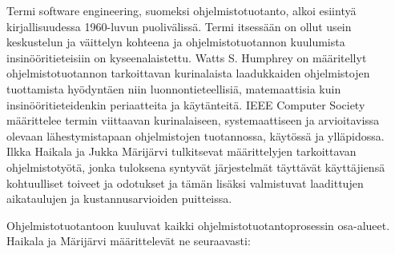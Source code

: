 \documentclass[finnish,12pt]{tktltiki2}
\theoremstyle{definition}
\theoremstyle{remark}
\begin{document}
Termi software engineering, suomeksi ohjelmistotuotanto, alkoi esiintyä kirjallisuudessa 1960-luvun puolivälissä. Termi itsessään on ollut usein keskustelun ja väittelyn kohteena ja ohjelmistotuotannon kuulumista insinööritieteisiin on kyseenalaistettu. \cite{DBLP:reference/se/Grier10,haikala2003ohjelmistotuotanto,mahoney04}
Watts S. Humphrey on määritellyt ohjelmistotuotannon tarkoittavan kurinalaista laadukkaiden ohjelmistojen tuottamista hyödyntäen niin luonnontieteellisiä, matemaattisia kuin insinööritieteidenkin periaatteita ja käytänteitä\cite{Humphrey:1988:SEP:75110.75122}. IEEE Computer Society määrittelee termin viittaavan kurinalaiseen, systemaattiseen ja arvioitavissa olevaan lähestymistapaan ohjelmistojen tuotannossa, käytössä ja ylläpidossa\cite{swebok}. Ilkka Haikala ja Jukka Märijärvi tulkitsevat määrittelyjen tarkoittavan ohjelmistotyötä, jonka tuloksena syntyvät järjestelmät täyttävät käyttäjiensä kohtuulliset toiveet ja odotukset ja tämän lisäksi valmistuvat laadittujen aikataulujen ja kustannusarvioiden puitteissa\cite{haikala2003ohjelmistotuotanto}.

Ohjelmistotuotantoon kuuluvat kaikki ohjelmistotuotantoprosessin osa-alueet. Haikala ja Märijärvi \cite{haikala2003ohjelmistotuotanto} määrittelevät ne seuraavasti:
\end{document}
